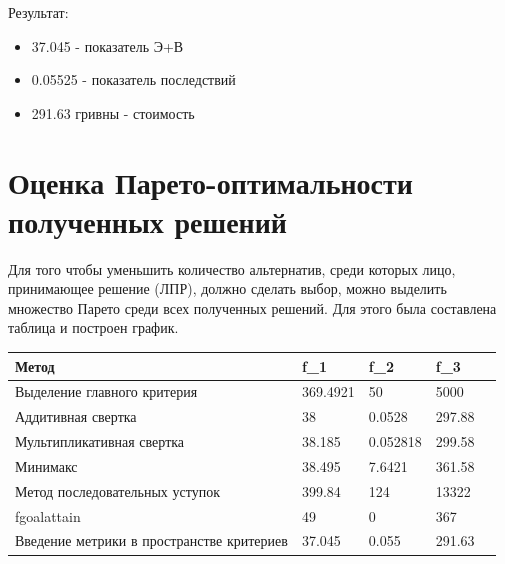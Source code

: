 \documentclass[14pt,a4paper,report]{report}
\begin{document}
Результат:
\begin{itemize}
\item 37.045 - показатель Э+В
\item 0.05525 - показатель последствий
\item 291.63 гривны - стоимость
\end{itemize}


















\clearpage


\section{Оценка Парето-оптимальности полученных решений}
Для того чтобы уменьшить количество альтернатив, среди которых лицо, принимающее решение (ЛПР), должно сделать выбор, можно выделить множество Парето среди всех полученных решений. Для этого была составлена таблица и построен график.

\begin{table}[h!]
\begin{tabular}{|l|l|l|l|l|}
\hline
Метод & f_1 & f_2 & f_3\\ \hline
Выделение главного критерия                 & 369.4921 & 50 & 5000     \\ \hline
 Аддитивная свертка                         & 38 & 0.0528 & 297.88     \\ \hline
 Мультипликативная свертка                  & 38.185 & 0.052818 & 299.58     \\ \hline
Минимакс                                    & 38.495 & 7.6421 & 361.58     \\ \hline
Метод последовательных уступок              & 399.84 & 124 & 13322     \\ \hline
fgoalattain                                 & 49 & 0 & 367    \\ \hline
 Введение метрики в пространстве критериев  & 37.045 & 0.055 & 291.63     \\ \hline

\end{tabular}
\end{table}
\end{document}
